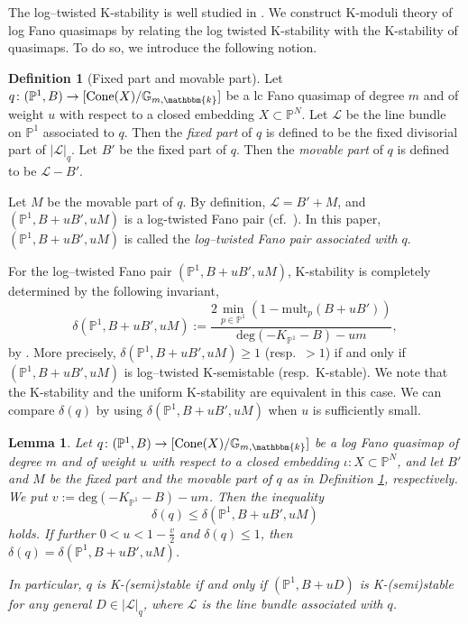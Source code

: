 \documentclass[12pt,twoside]{amsart}
\newtheorem{lem}[thm]{Lemma}
\theoremstyle{definition}
\newtheorem{defn}[thm]{Definition}
\begin{document}
The log--twisted K-stability is well studied in \cite{BLZ,Hat}.
We construct K-moduli theory of log Fano quasimaps by relating the log twisted K-stability with the K-stability of quasimaps.
To do so, we introduce the following notion.

\begin{defn}[Fixed part and movable part]\label{defn--fixed-movable-part-quasimap}
Let $q\colon(\mathbb{P}^1,B)\to [\mathrm{Cone}(X)/\mathbb{G}_{m, \mathbbm{k}}]$ be a lc Fano quasimap of degree $m$ and of weight $u$ with respect to a closed embedding $X\subset\mathbb{P}^N$. 
Let $\mathscr{L}$ be the line bundle on $\mathbb{P}^{1}$ associated to $q$.  
Then the {\it fixed part} of $q$ is defined to be the fixed divisorial part  of $|\mathscr{L}|_q$. 
Let $B'$ be the fixed part of $q$. 
Then the {\it movable part} of $q$ is defined to be $\mathscr{L}-B'$. 

Let $M$ be the movable part of $q$. 
By definition, $\mathscr{L}=B'+M$, and $(\mathbb{P}^1,B+uB',uM)$ is a log-twisted Fano pair (cf.~\cite{Hat}).
In this paper, $(\mathbb{P}^1,B+uB',uM)$ is called the {\it log--twisted Fano pair associated with $q$}. 
\end{defn}


For the log--twisted Fano pair $(\mathbb{P}^1,B+uB',uM)$, K-stability is completely determined by the following invariant, 
\begin{equation*}
    \delta(\mathbb{P}^1,B+uB',uM):=\frac{2\min_{p\in\mathbb{P}^1}(1-\mathrm{mult}_p(B+uB'))}{\mathrm{deg}(-K_{\mathbb{P}^1}-B)-um}\label{eq--delta--log--twisted--map},
\end{equation*}
by \cite[Theorem A.16]{Hat}.
More precisely, $\delta(\mathbb{P}^1,B+uB',uM)\ge 1$ (resp.~$>1$) if and only if $(\mathbb{P}^1,B+uB',uM)$ is log--twisted K-semistable (resp.~K-stable). We note that the K-stability and the uniform K-stability are equivalent in this case.
We can compare $\delta(q)$ by using $\delta(\mathbb{P}^1,B+uB',uM)$ when $u$ is sufficiently small. 


\begin{lem}\label{lem--two--delta--invariants}
    Let $q\colon(\mathbb{P}^1,B)\to [\mathrm{Cone}(X)/\mathbb{G}_{m, \mathbbm{k}}]$ be a log Fano quasimap of degree $m$ and of weight $u$ with respect to a closed embedding $\iota\colon X\subset\mathbb{P}^N$, and let $B'$ and $M$ be the fixed part and the movable part of $q$ as in Definition \ref{defn--fixed-movable-part-quasimap}, respectively.
    We put $v:=\mathrm{deg}(-K_{\mathbb{P}^1}-B)-um$.
Then the inequality 
$$\delta(q)\le \delta(\mathbb{P}^1,B+uB',uM)$$
holds. 
    If further $0<u<1-\frac{v}{2}$ and $\delta(q)\le1$, then $\delta(q)=\delta(\mathbb{P}^1,B+uB',uM)$.


    In particular, $q$ is K-(semi)stable if and only if $(\mathbb{P}^1,B+uD)$ is K-(semi)stable for any general $D\in|\mathscr{L}|_q$, where $\mathscr{L}$ is the line bundle associated with $q$.
\end{lem}
\end{document}
